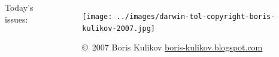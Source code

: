 
\begin{noheadline}
\begin{frame}
    \begin{columns}[c]
            Today's issues:
            \tableofcontents[subsectionstyle=hide]
            \begin{figure}
                \begin{center}
                \texttt{[image: ../images/darwin-tol-copyright-boris-kulikov-2007.jpg]}
                \caption{\tiny \copyright~2007 Boris Kulikov \href{http://boris-kulikov.blogspot.com/}{boris-kulikov.blogspot.com}}
                \end{center}
            \end{figure}
    \end{columns}
\end{frame}
\end{noheadline}


